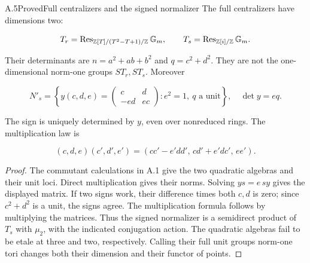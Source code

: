 \begin{statement}{A.5}{Proved}{Full centralizers and the signed normalizer}
The full centralizers have dimensions two:

$$
T_r=\operatorname{Res}_{\mathbb Z[T]/(T^2-T+1)/\mathbb Z}\mathbb G_m,\qquad
 T_s=\operatorname{Res}_{\mathbb Z[i]/\mathbb Z}\mathbb G_m.
$$

Their determinants are $n=a^2+ab+b^2$ and $q=c^2+d^2$.
They are not the one-dimensional norm-one groups $ST_r,ST_s$.
Moreover

$$
N'_s=\left\{
 y(c,d,e)=\begin{pmatrix}c&d\\-ed&ec\end{pmatrix}:
 e^2=1,\ q\text{ a unit}\right\},
\quad \det y=eq .
$$

The sign is uniquely determined by $y$, even over nonreduced
rings. The multiplication law is

$$
(c,d,e)(c',d',e')
 =(cc'-e'dd',\,cd'+e'dc',\,ee').
$$

\end{statement}
\begin{proof}
The commutant calculations in A.1 give the two quadratic
algebras and their unit loci. Direct multiplication gives their
norms. Solving $ys=e\,sy$ gives the displayed matrix.
If two signs work, their difference times both $c,d$ is zero;
since $c^2+d^2$ is a unit, the signs agree.
The multiplication formula follows by multiplying the matrices.
Thus the signed normalizer is a semidirect product of $T_s$
with $\mu_2$, with the indicated conjugation action.
The quadratic algebras fail to be etale at three and two,
respectively. Calling their full unit groups norm-one tori
changes both their dimension and their functor of points.
\end{proof}

